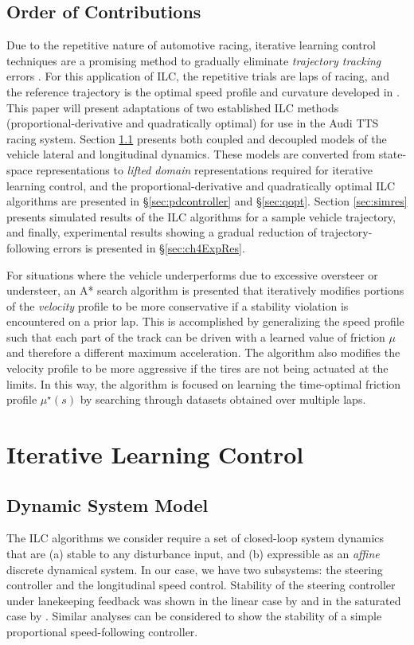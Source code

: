 \documentclass[9pt,shortpaper,twoside,web]{ieeecolor}
\begin{document}
{{{\subsection{Order of Contributions}

Due to the repetitive nature of automotive racing, iterative learning control techniques are a promising method to gradually
eliminate \textit{trajectory tracking} errors . For this application of ILC, the repetitive trials are laps of racing, and the reference trajectory is the optimal speed profile and curvature developed in \cite{kapaniadscc}. This paper will present adaptations of two established ILC methods 
(proportional-derivative and quadratically optimal) for use in the Audi TTS racing system. Section \ref{sec:ch4dsm} presents
both coupled and decoupled models of the vehicle lateral and longitudinal dynamics. These models are converted from state-space representations to \textit{lifted domain}
representations required for iterative learning control, and the proportional-derivative and quadratically optimal ILC algorithms are presented in \S \ref{sec:pdcontroller} and \S \ref{sec:qopt}. Section \ref{sec:simres} presents simulated results of the ILC algorithms for a sample vehicle trajectory, and finally,
experimental results showing a gradual reduction of trajectory-following errors is presented in \S \ref{sec:ch4ExpRes}.

For situations where the vehicle underperforms due to excessive oversteer or understeer, an A* search algorithm is presented
that iteratively modifies portions of the \textit{velocity} profile to be more conservative if a stability violation is encountered on a prior lap. This is accomplished by generalizing the speed profile such that each part of the track can be driven with a learned  value of friction $\mu$ and therefore a different maximum
acceleration. The algorithm also modifies the velocity profile to be more aggressive if the tires are not being actuated at the limits. In this way, the algorithm is focused on learning the time-optimal friction profile $\mu^\star(s)$ by searching through datasets obtained over multiple laps. 

\section{Iterative Learning Control}

\subsection{Dynamic System Model}
\label{sec:ch4dsm}
The ILC algorithms we consider require a set of closed-loop system dynamics that are (a) stable to any disturbance input, and (b) expressible as an \textit{affine} discrete dynamical system.
In our case, we have two subsystems: the steering controller and the longitudinal speed control. Stability of the steering controller
under lanekeeping feedback was shown in the linear case by \cite{rossetter2002} and in the saturated case by \cite{talvala}. Similar analyses can be considered to show the stability of a simple proportional speed-following controller.

}}}
\end{document}
